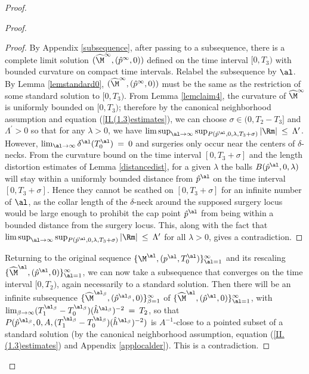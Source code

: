 \begin{proof}
\begin{proof}
\begin{proof}
By Appendix \ref{subsequence}, after
passing to a subsequence, there is a complete limit solution
$(\widehat{\M}^\infty, (\hat{p}^\infty,0))$ defined on the time
interval $[0, T_3)$ with bounded curvature on compact time intervals.
Relabel the subsequence by $\al$. By Lemma \ref{lemstandard0},
$(\widehat{\M}^\infty, (\hat{p}^\infty,0))$ must be the same as the
restriction of some standard solution to $[0, T_3)$.
From Lemma \ref{lemclaim4}, the  curvature of $\widehat{\M}^\infty$ is uniformly
bounded on $[0, T_3)$; therefore by the canonical neighborhood assumption and equation
(\ref{II.(1.3)estimates}),
we can choose $\sigma \in (0, T_2 - T_3]$ and $\Lambda^\prime > 0$
so that for any $\lambda > 0$,  we have
$\limsup_{\al \rightarrow \infty}
\sup_{P(\hat{p}^{\al}, 0, \lambda, T_3 + \sigma)} |\Rm| \: \le \: \Lambda^\prime$.
However, $\lim_{\al \rightarrow \infty}
\delta^\al (T_0^\al) \: = \: 0$ and surgeries only occur near the
centers of $\delta$-necks. From the curvature bound on the time
interval $[0, T_3 + \sigma]$ and the length distortion
estimates of Lemma \ref{distancedist}, for a given $\lambda$ the
balls $B(\hat{p}^{\al}, 0, \lambda)$ will stay within
a uniformly bounded distance from $\hat{p}^{\al}$ on the time interval
$[0, T_3 + \sigma]$. Hence they
cannot be scathed on $[0, T_3 + \sigma]$ for an infinite number of $\al$,
as the collar length of the $\delta$-neck around the supposed surgery locus
would be large enough to prohibit the cap point $\hat{p}^{\al}$
from being within a bounded
distance from the surgery locus.
This, along with the fact that $\limsup_{\al \rightarrow \infty}
\sup_{P(\hat{p}^{\al}, 0, \lambda, T_3 + \sigma)} |\Rm| \: \le \: \Lambda^\prime$
for all $\lambda > 0$,
gives a contradiction.
\end{proof}

Returning to the original sequence
$\{\M^\al, (p^\al,T_0^\al) \}_{\al = 1}^\infty$ and its rescaling
$\{ \widehat{\M}^\al, (\hat{p}^\al,0) \}_{\al = 1}^\infty$, we can now
take a subsequence that converges on the time interval $[0, T_2)$,
again necessarily to a standard solution.  Then there will be
an infinite subsequence
$\{ \widehat{\M}^{\al_\beta}, (\hat{p}^{\al_\beta},0) \}_{\beta = 1}^\infty$
of
$\{ \widehat{\M}^{\al}, (\hat{p}^{\al},0) \}_{\al = 1}^\infty$,
with
$\lim_{\beta \rightarrow \infty}
(T_1^{\al_\beta} - T_0^{\al_\beta})(\hat{h}^{\al_\beta})^{-2} \: = \: T_2$,
so that $P(\hat{p}^{\al_\beta}, 0, A, (T_1^{\al_\beta} - T_0^{\al_\beta})
(\hat{h}^{\al_\beta})^{-2})$
is $A^{-1}$-close to a pointed
subset of a standard solution (by the canonical
neighborhood assumption, equation
(\ref{II.(1.3)estimates}) and Appendix \ref{applocalder}).
This is a contradiction.
\end{proof}


\end{proof}
